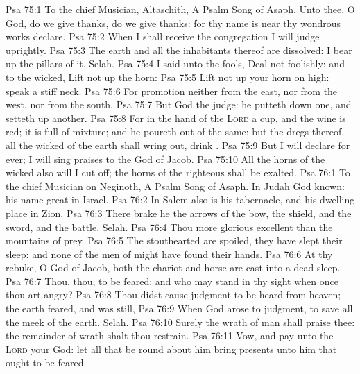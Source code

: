 \vs Psa 75:1 To the chief Musician, Altaschith, A Psalm  Song of Asaph. Unto thee, O God, do we give thanks,  do we give thanks: for  thy name is near thy wondrous works declare.
\vs Psa 75:2 When I shall receive the congregation I will judge uprightly.
\vs Psa 75:3 The earth and all the inhabitants thereof are dissolved: I bear up the pillars of it. Selah.
\vs Psa 75:4 I said unto the fools, Deal not foolishly: and to the wicked, Lift not up the horn:
\vs Psa 75:5 Lift not up your horn on high: speak  a stiff neck.
\vs Psa 75:6 For promotion  neither from the east, nor from the west, nor from the south.
\vs Psa 75:7 But God  the judge: he putteth down one, and setteth up another.
\vs Psa 75:8 For in the hand of the \textsc{Lord}  a cup, and the wine is red; it is full of mixture; and he poureth out of the same: but the dregs thereof, all the wicked of the earth shall wring  out,  drink .
\vs Psa 75:9 But I will declare for ever; I will sing praises to the God of Jacob.
\vs Psa 75:10 All the horns of the wicked also will I cut off;  the horns of the righteous shall be exalted.
\vs Psa 76:1 To the chief Musician on Neginoth, A Psalm  Song of Asaph. In Judah  God known: his name  great in Israel.
\vs Psa 76:2 In Salem also is his tabernacle, and his dwelling place in Zion.
\vs Psa 76:3 There brake he the arrows of the bow, the shield, and the sword, and the battle. Selah.
\vs Psa 76:4 Thou  more glorious  excellent than the mountains of prey.
\vs Psa 76:5 The stouthearted are spoiled, they have slept their sleep: and none of the men of might have found their hands.
\vs Psa 76:6 At thy rebuke, O God of Jacob, both the chariot and horse are cast into a dead sleep.
\vs Psa 76:7 Thou,  thou,  to be feared: and who may stand in thy sight when once thou art angry?
\vs Psa 76:8 Thou didst cause judgment to be heard from heaven; the earth feared, and was still,
\vs Psa 76:9 When God arose to judgment, to save all the meek of the earth. Selah.
\vs Psa 76:10 Surely the wrath of man shall praise thee: the remainder of wrath shalt thou restrain.
\vs Psa 76:11 Vow, and pay unto the \textsc{Lord} your God: let all that be round about him bring presents unto him that ought to be feared.
